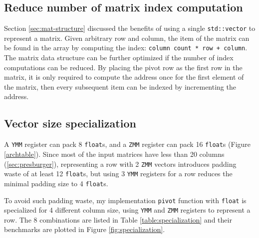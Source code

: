 \documentclass[logo,bsc,singlespacing,parskip]{infthesis}
\newcommand{\dtfloat}{\texttt{float}}
\newcommand{\pivot}{\texttt{pivot}}
\newcommand{\ymm}{\texttt{YMM}}
\newcommand{\zmm}{\texttt{ZMM}}
\begin{document}
\subsection{Reduce number of matrix index computation}
\label{sec:optmz-get-index}

Section \ref{sec:mat-structure} discussed the benefits of using a single
\texttt{std::vector} to represent a matrix. Given arbitrary row and column, the
item of the matrix can be found in the array by computing the index:
\texttt{column count * row + column}. The matrix data structure can be further
optimized if the number of index computations can be reduced. By placing the
pivot row as the first row in the matrix, it is only required to compute the
address once for the first element of the matrix, then every subsequent item can
be indexed by incrementing the address. 




\subsection{Vector size specialization}

A \ymm{} register can pack 8 \dtfloat{}s, and a \zmm{} register can pack 16
\dtfloat{}s (Figure \ref{archtable}). Since most of the input matrices have less
than 20 columns (\ref{sec:presburger}), representing a row with 2 \zmm{} vectors
introduces padding waste of at least 12 \dtfloat{}s, but using 3 \ymm{}
registers for a row reduces the minimal padding size to 4 \dtfloat{}s. 

To avoid such padding waste, my implementation \pivot{} function with \dtfloat{}
is specialized for 4 different column size, using \ymm{} and \zmm{} registers to
represent a row. The 8 combinations are listed in Table
\ref{table:specialization} and their benchmarks are plotted in Figure
\ref{fig:specialization}.
\end{document}
